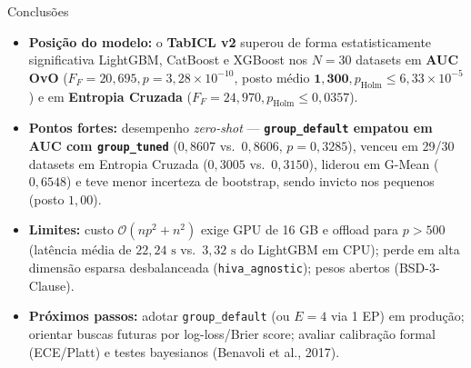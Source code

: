 \documentclass[aspectratio=169,11pt]{beamer}
\begin{document}
\begin{frame}{Conclusões}
    \small
    \begin{itemize}
        \setlength{\itemsep}{3pt}
        \item \textbf{Posição do modelo:} o \textbf{TabICL v2} superou de forma estatisticamente significativa LightGBM, CatBoost e XGBoost nos $N=30$ datasets em \textbf{AUC OvO} ($F_F = 20{,}695, p = 3{,}28 \times 10^{-10}$, posto médio $\mathbf{1{,}300}, p_{\mathrm{Holm}} \le 6{,}33 \times 10^{-5}$) e em \textbf{Entropia Cruzada} ($F_F = 24{,}970, p_{\mathrm{Holm}} \le 0{,}0357$).
        \item \textbf{Pontos fortes:} desempenho \textit{zero-shot} --- \textbf{\texttt{group\_default} empatou em AUC com \texttt{group\_tuned}} ($0{,}8607$ vs.\ $0{,}8606$, $p=0{,}3285$), venceu em 29/30 datasets em Entropia Cruzada ($0{,}3005$ vs.\ $0{,}3150$), liderou em G-Mean ($0{,}6548$) e teve menor incerteza de bootstrap, sendo invicto nos pequenos (posto $1{,}00$).
        \item \textbf{Limites:} custo $\mathcal{O}(n p^2 + n^2)$ exige GPU de 16 GB e offload para $p > 500$ (latência média de $22{,}24\text{ s}$ vs.\ $3{,}32\text{ s}$ do LightGBM em CPU); perde em alta dimensão esparsa desbalanceada (\texttt{hiva\_agnostic}); pesos abertos (BSD-3-Clause).
        \item \textbf{Próximos passos:} adotar \texttt{group\_default} (ou $E=4$ via 1 EP) em produção; orientar buscas futuras por log-loss/Brier score; avaliar calibração formal (ECE/Platt) e testes bayesianos (Benavoli et al., 2017).
    \end{itemize}
\end{frame}
\end{document}
